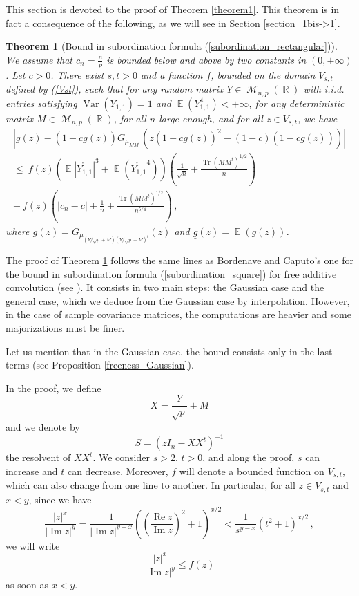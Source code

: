 \documentclass[11pt,a4paper]{article}
\DeclareMathOperator{\E}{\mathbb{E}}
\DeclareMathOperator{\R}{\mathbb{R}}
\DeclareMathOperator{\MM}{\mathcal{M}}
\DeclareMathOperator{\1}{\mathbf{1}}
\DeclareMathOperator{\Reel}{\mathrm{Re}}
\DeclareMathOperator{\Imag}{\mathrm{Im}}
\DeclareMathOperator{\Var}{\mathrm{Var}}
\DeclareMathOperator{\Tr}{\mathrm{Tr}}
\newcommand{\gbar}{\underline{g}}
\newtheorem{Theorem}[Proposition]{Theorem}
\theoremstyle{definition}
\begin{document}
This section is devoted to the proof of Theorem \ref{theorem1}. This theorem is in fact a consequence of the following, as we will see in Section \ref{section_1bis->1}.

\begin{Theorem}[Bound in subordination formula (\ref{subordination_rectangular})] \label{theorem1bis}
We assume that $c_n = \frac{n}{p}$ is bounded below and above by two constants in $(0,+\infty)$. Let $c>0$. There exist $s,t>0$ and a function $f$, bounded on the domain $V_{s,t}$ defined by (\ref{Vst}), such that for any random matrix $Y \in \MM_{n,p}(\R)$ with i.i.d. entries satisfying $\Var(Y_{1,1})=1$ and $\E(Y_{1,1}^4) < +\infty$, for any deterministic matrix $M \in \MM_{n,p}(\R)$, for all $n$ large enough, and for all $z \in V_{s,t}$, we have
\begin{multline*}
\left| \gbar(z) - (1-c\gbar(z)) G_{\mu_{MM^t}}(z(1-c\gbar(z))^2-(1-c)(1-c\gbar(z))) \right| \\
\le \ f(z) \left( \E |\mathring{Y_{1,1}}|^3 + \E(\mathring{Y_{1,1}}^4) \right) \left( \frac{1}{\sqrt{n}} + \frac{\Tr(MM^t)^{1/2}}{n} \right) \\
+ \ f(z) \left( |c_n-c| + \frac1n + \frac{\Tr(MM^t)^{1/2}}{n^{5/4}} \right) \, ,
\end{multline*}
where $g(z) = G_{\mu_{(Y/\sqrt{p}+M)(Y/\sqrt{p}+M)^t}}(z)$ and $\gbar(z) = \E(g(z))$.
\end{Theorem}

The proof of Theorem \ref{theorem1bis} follows the same lines as Bordenave and Caputo's one for the bound in subordination formula (\ref{subordination_square}) for free additive convolution (see \cite[Theorem A.1]{BC}). It consists in two main steps: the Gaussian case and the general case, which we deduce from the Gaussian case by interpolation. However, in the case of sample covariance matrices, the computations are heavier and some majorizations must be finer.

Let us mention that in the Gaussian case, the bound consists only in the last terms (see Proposition \ref{freeness_Gaussian}).

In the proof, we define
\begin{displaymath}
X = \frac{Y}{\sqrt{p}} + M
\end{displaymath}
and we denote by
\begin{displaymath}
S=(zI_n-XX^t)^{-1}
\end{displaymath}
the resolvent of $XX^t$. We consider $s>2$, $t>0$, and along the proof, $s$ can increase and $t$ can decrease. Moreover, $f$ will denote a bounded function on $V_{s,t}$, which can also change from one line to another. In particular, for all $z \in V_{s,t}$ and $x<y$, since we have
\begin{displaymath}
\frac{|z|^x}{|\Imag z|^y} = \frac{1}{|\Imag z|^{y-x}} \left( \left( \frac{\Reel z}{\Imag z} \right)^2 + 1 \right)^{x/2} < \frac{1}{s^{y-x}} (t^2+1)^{x/2} \, ,
\end{displaymath}
we will write
\begin{displaymath}
\frac{|z|^x}{|\Imag z|^y} \le f(z)
\end{displaymath}
as soon as $x<y$.
\end{document}
